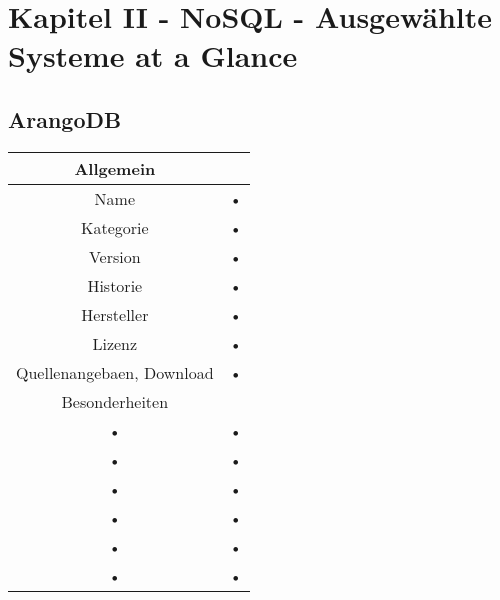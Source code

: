 \chapter{Kapitel II - NoSQL - Ausgewählte Systeme at a Glance}
\setcounter{section}{7}
\section{ArangoDB}
\begin{tabular}{|c|c|}
\hline 
Allgemein \\ 
\hline 
Name & • \\ 
\hline 
Kategorie & • \\ 
\hline 
Version & • \\ 
\hline 
Historie & • \\ 
\hline 
Hersteller & • \\ 
\hline 
Lizenz & • \\ 
\hline 
Quellenangebaen, Download & • \\ 
\hline 
Besonderheiten \\ 
\hline 
• & • \\ 
\hline 
• & • \\ 
\hline 
• & • \\ 
\hline 
• & • \\ 
\hline 
• & • \\ 
\hline 
• & • \\ 
\hline 
\end{tabular} 

